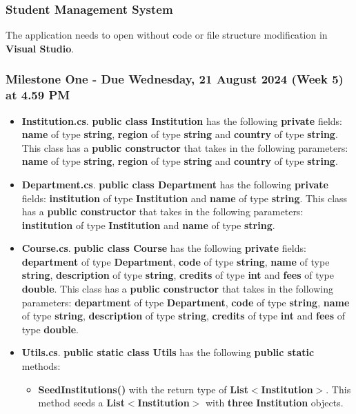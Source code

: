 \documentclass{article}
\begin{document}
\subsubsection*{Student Management System}

The application needs to open without code or file structure modification in \textbf{Visual Studio}.

\subsubsection*{Milestone One - Due Wednesday, 21 August 2024 (Week 5) at 4.59 PM}

\begin{itemize}
    \item \textbf{Institution.cs}. \textbf{public class Institution} has the following \textbf{private} fields: \textbf{name} of type \textbf{string}, \textbf{region} of type \textbf{string} and \textbf{country} of type \textbf{string}. This class has a \textbf{public constructor} that takes in the following parameters: \textbf{name} of type \textbf{string}, \textbf{region} of type \textbf{string} and \textbf{country} of type \textbf{string}. 
    \item \textbf{Department.cs}. \textbf{public class Department} has the following \textbf{private} fields: \textbf{institution} of type \textbf{Institution} and \textbf{name} of type \textbf{string}. This class has a \textbf{public constructor} that takes in the following parameters: \textbf{institution} of type \textbf{Institution} and \textbf{name} of type \textbf{string}.
    \item \textbf{Course.cs}. \textbf{public class Course} has the following \textbf{private} fields: \textbf{department} of type \textbf{Department}, \textbf{code} of type \textbf{string}, \textbf{name} of type \textbf{string}, \textbf{description} of type \textbf{string}, \textbf{credits} of type \textbf{int} and \textbf{fees} of type \textbf{double}. This class has a \textbf{public constructor} that takes in the following parameters: \textbf{department} of type \textbf{Department}, \textbf{code} of type \textbf{string}, \textbf{name} of type \textbf{string}, \textbf{description} of type \textbf{string}, \textbf{credits} of type \textbf{int} and \textbf{fees} of type \textbf{double}.
    \item \textbf{Utils.cs}. \textbf{public static class Utils} has the following \textbf{public static} methods:
    \begin{itemize}
        \item \textbf{SeedInstitutions()} with the return type of \textbf{List$<$Institution$>$}. This method seeds a \textbf{List$<$Institution$>$} with \textbf{three} \textbf{Institution} objects.

\end{itemize}
\end{itemize}
\end{document}
